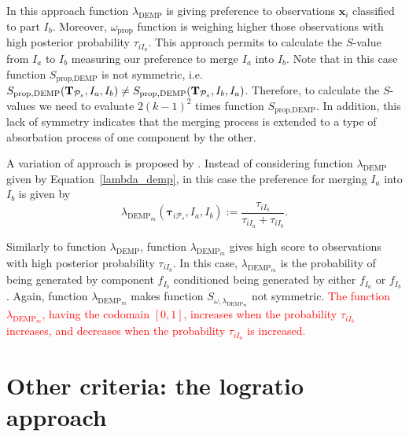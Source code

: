 \documentclass[submit]{smj}
\theoremstyle{definition}
\newcommand{\m}[1]{\boldsymbol{#1}}
\begin{document}
In this approach function $\lambda_{\text{DEMP}}$ is giving preference to observations $\m x_i$ classified to part $I_b$. Moreover, $\omega_{\text{prop}}$ function is weighing higher those observations with high posterior probability $\tau_{iI_a}$. This approach permits to calculate the $S$-value from $I_a$ to $I_b$ measuring our preference to merge $I_a$ into $I_b$. Note that in this case function  $S_{\text{prop}, \text{DEMP}}$ is not symmetric, i.e. $S_{\text{prop}, \text{DEMP}}(\text{\textbf{T}}_{\mathcal{P}_s},  I_a,  I_b) \neq S_{\text{prop}, \text{DEMP}}(\text{\textbf{T}}_{\mathcal{P}_s},  I_b,  I_a)$. Therefore, to calculate the $S$-values we need to evaluate $2 (k-1)^2$ times function $S_{\text{prop}, \text{DEMP}}$. In addition, this lack of symmetry indicates that the merging process is extended to a type of absorbation process of one component by the other.

A variation of \cite{hennig2010methods} approach is proposed by \cite{longford2014}. Instead of considering function $\lambda_{\text{DEMP}}$ given by Equation~\ref{lambda_demp}, in this case the preference for merging $I_a$ into $I_b$ is given by
\begin{equation}\label{lambda_dempM}
\lambda_{\text{DEMP}_m}(\m\tau_{i \mathcal{P}_s},  I_a,  I_b) := \frac{\tau_{iI_b}}{\tau_{iI_a} + \tau_{iI_b}}.
\end{equation}

Similarly to function $\lambda_{\text{DEMP}}$, function $\lambda_{\text{DEMP}_m}$ gives high score to observations with high posterior probability $\tau_{iI_b}$. In this case, $\lambda_{\text{DEMP}_m}$ is the probability of being generated by component $f_{I_b}$ conditioned being generated by either $f_{I_a}$ or $f_{I_b}$. Again, function $\lambda_{\text{DEMP}_m}$ makes function $S_{\omega, \lambda_{\text{DEMP}_m}}$ not symmetric. \textcolor{red}{The function $\lambda_{\text{DEMP}_m}$, having the codomain $[0,1]$, increases when the probability $\tau_{iI_b}$ increases, and decreases when the probability $\tau_{iI_a}$ is increased.}


\section{Other criteria: the logratio approach}\label{logratio_section}
\end{document}

